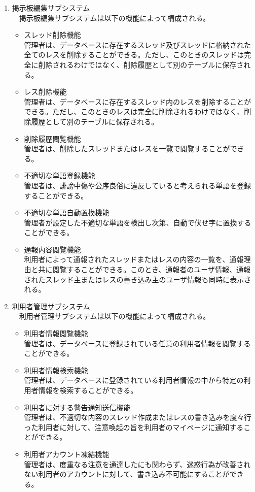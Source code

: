 \documentclass[a4j]{jarticle}
\begin{document}
\begin{enumerate}
  \item 掲示板編集サブシステム\\
  　掲示板編集サブシステムは以下の機能によって構成される。
  \begin{itemize}
    \item スレッド削除機能\\
    管理者は、データベースに存在するスレッド及びスレッドに格納された全てのレスを削除することができる。ただし、このときのスレッドは完全に削除されるわけではなく、削除履歴として別のテーブルに保存される。
    \item レス削除機能\\
    管理者は、データベースに存在するスレッド内のレスを削除することができる。ただし、このときのレスは完全に削除されるわけではなく、削除履歴として別のテーブルに保存される。
    \item 削除履歴閲覧機能\\
    管理者は、削除したスレッドまたはレスを一覧で閲覧することができる。
    \item 不適切な単語登録機能\\
    管理者は、誹謗中傷や公序良俗に違反していると考えられる単語を登録することができる。
    \item 不適切な単語自動置換機能\\
    管理者が設定した不適切な単語を検出し次第、自動で伏せ字に置換することができる。
    \item 通報内容閲覧機能\\
    利用者によって通報されたスレッドまたはレスの内容の一覧を、通報理由と共に閲覧することができる。このとき、通報者のユーザ情報、通報されたスレッド主またはレスの書き込み主のユーザ情報も同時に表示される。\\
  \end{itemize}


  \item 利用者管理サブシステム\\
  　利用者管理サブシステムは以下の機能によって構成される。
  \begin{itemize}
    \item 利用者情報閲覧機能\\
    管理者は、データベースに登録されている任意の利用者情報を閲覧することができる。
    \item 利用者情報検索機能\\
    管理者は、データベースに登録されている利用者情報の中から特定の利用者情報を検索することができる。
    \item 利用者に対する警告通知送信機能\\
    管理者は、不適切な内容のスレッド作成またはレスの書き込みを度々行った利用者に対して、注意喚起の旨を利用者のマイページに通知することができる。
    \item 利用者アカウント凍結機能\\
    管理者は、度重なる注意を通達したにも関わらず、迷惑行為が改善されない利用者のアカウントに対して、書き込み不可能にすることができる。\\
  \end{itemize}



\end{enumerate}
\end{document}
